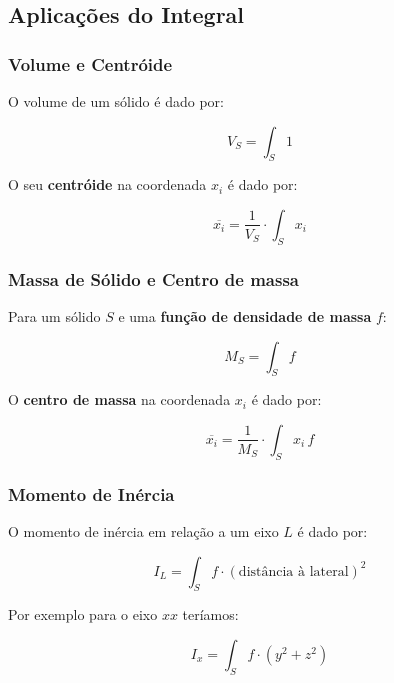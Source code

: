 \documentclass[11pt, a4paper]{article}
\begin{document}
\subsection{Aplicações do Integral}

\subsubsection{Volume e Centróide}

O volume de um sólido é dado por:

\begin{equation*}
    V_S = \int_{S} 1
\end{equation*}

O seu \textbf{centróide} na coordenada $x_i$ é dado por:

\begin{equation*}
    \overline{x_i} = \frac{1}{V_S} \cdot \int_{S} x_i
\end{equation*}

\subsubsection{Massa de Sólido e Centro de massa}

Para um sólido $S$ e uma \textbf{função de densidade de massa} $f$:

\begin{equation*}
    M_S = \int_{S} f
\end{equation*}

O \textbf{centro de massa} na coordenada $x_i$ é dado por:

\begin{equation*}
    \overline{x_i} = \frac{1}{M_S} \cdot \int_{S} x_i \, f
\end{equation*}

\subsubsection{Momento de Inércia}

O momento de inércia em relação a um eixo $L$ é dado por:

\begin{equation*}
    I_L = \int_{S} f \cdot \left(\text{distância à lateral}\right)^2
\end{equation*}

Por exemplo para o eixo $xx$ teríamos:

\begin{equation*}
    I_x = \int_{S} f \cdot \left(y^2 + z^2\right)
\end{equation*}
\end{document}
